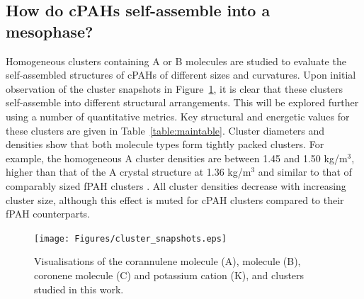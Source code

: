 \subsection{How do cPAHs self-assemble into a mesophase?} %
%
Homogeneous clusters containing A or B molecules are studied to evaluate the self-assembled structures of cPAHs of different sizes and curvatures. Upon initial observation of the cluster snapshots in Figure~\ref{fig:clustersnapshots}, it is clear that these clusters self-assemble into different structural arrangements.  This will be explored further using a number of quantitative metrics. Key structural and energetic values for these clusters are given in Table~\ref{table:maintable}. Cluster diameters and densities show that both molecule types form tightly packed clusters. For example, the homogeneous A cluster densities are between 1.45 and 1.50 kg/$\text{m}^{3}$, higher than that of the A crystal structure at 1.36 kg/$\text{m}^{3}$ \cite{CORANN11unitcell} and similar to that of comparably sized fPAH clusters \cite{chen2014size}. All cluster densities decrease with increasing cluster size, although this effect is muted for cPAH clusters compared to their fPAH counterparts. 
%
\begin{figure}[!tbh]
\centering
\texttt{[image: Figures/cluster\_snapshots.eps]}
\caption{Visualisations of the corannulene molecule (A),  molecule (B), coronene molecule (C) and potassium cation (K), and clusters studied in this work.}
\label{fig:clustersnapshots}
\end{figure}
%
%
